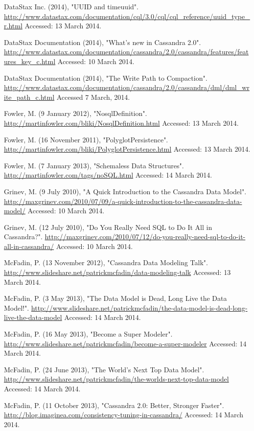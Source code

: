 \documentclass[letterpaper]{article}
\begin{document}
DataStax Inc. (2014), "UUID and timeuuid".
\url{http://www.datastax.com/documentation/cql/3.0/cql/cql_reference/uuid_type_r.html}
Accessed: 13 March 2014.

DataStax Documentation (2014), "What's new in Cassandra 2.0".
\url{http://www.datastax.com/documentation/cassandra/2.0/cassandra/features/features_key_c.html}
Accessed: 10 March 2014.

DataStax Documentation (2014), "The Write Path to Compaction".
\url{http://www.datastax.com/documentation/cassandra/2.0/cassandra/dml/dml_write_path_c.html}
Accessed 7 March, 2014.


Fowler, M. (9 January 2012), "NosqlDefinition".
\url{http://martinfowler.com/bliki/NosqlDefinition.html}
Accessed: 13 March 2014.

Fowler, M. (16 November 2011), "PolyglotPersistence".
\url{http://martinfowler.com/bliki/PolyglotPersistence.html}
Accessed: 13 March 2014.

Fowler, M. (7 January 2013), "Schemaless Data Structures".
\url{http://martinfowler.com/tags/noSQL.html}
Accessed: 14 March 2014.


Grinev, M. (9 July 2010), "A Quick Introduction to the Cassandra Data Model".
\url{http://maxgrinev.com/2010/07/09/a-quick-introduction-to-the-cassandra-data-model/}
Accessed: 10 March 2014.

Grinev, M. (12 July 2010), "Do You Really Need SQL to Do It All in Cassandra?".
\url{ http://maxgrinev.com/2010/07/12/do-you-really-need-sql-to-do-it-all-in-cassandra/}
Accessed: 10 March 2014.


McFadin, P. (13 November 2012), "Cassandra Data Modeling Talk".
\url{http://www.slideshare.net/patrickmcfadin/data-modeling-talk}
Accessed: 13 March 2014.

McFadin, P. (3 May 2013), "The Data Model is Dead, Long Live the Data Model!".
\url{http://www.slideshare.net/patrickmcfadin/the-data-model-is-dead-long-live-the-data-model}
Accessed: 14 March 2014.

McFadin, P. (16 May 2013), "Become a Super Modeler".
\url{http://www.slideshare.net/patrickmcfadin/become-a-super-modeler}
Accessed: 14 March 2014.

McFadin, P. (24 June 2013), "The World's Next Top Data Model".
\url{http://www.slideshare.net/patrickmcfadin/the-worlds-next-top-data-model}
Accessed: 14 March 2014.

McFadin, P. (11 October 2013), "Cassandra 2.0: Better, Stronger Faster".
\url{http://blog.imaginea.com/consistency-tuning-in-cassandra/}
Accessed: 14 March 2014.
\end{document}
